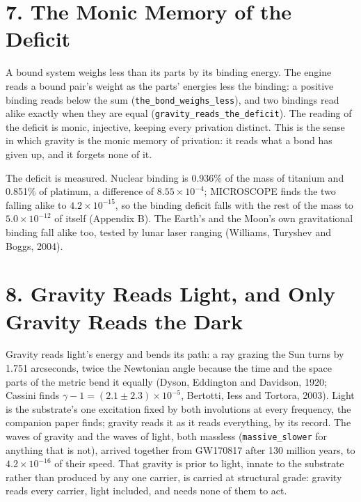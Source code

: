 \documentclass[10pt]{article}
\begin{document}
\hypertarget{the-monic-memory-of-the-deficit}{%
\section{7. The Monic Memory of the
Deficit}\label{the-monic-memory-of-the-deficit}}

A bound system weighs less than its parts by its binding energy. The
engine reads a bound pair's weight as the parts' energies less the
binding: a positive binding reads below the sum
(\texttt{the\_bond\_weighs\_less}), and two bindings read alike exactly
when they are equal (\texttt{gravity\_reads\_the\_deficit}). The reading
of the deficit is monic, injective, keeping every privation distinct.
This is the sense in which gravity is the monic memory of privation: it
reads what a bond has given up, and it forgets none of it.

The deficit is measured. Nuclear binding is 0.936\% of the mass of
titanium and 0.851\% of platinum, a difference of \(8.55\times10^{-4}\);
MICROSCOPE finds the two falling alike to \(4.2\times10^{-15}\), so the
binding deficit falls with the rest of the mass to \(5.0\times10^{-12}\)
of itself (Appendix B). The Earth's and the Moon's own gravitational
binding fall alike too, tested by lunar laser ranging (Williams,
Turyshev and Boggs, 2004).

\hypertarget{gravity-reads-light-and-only-gravity-reads-the-dark}{%
\section{8. Gravity Reads Light, and Only Gravity Reads the
Dark}\label{gravity-reads-light-and-only-gravity-reads-the-dark}}

Gravity reads light's energy and bends its path: a ray grazing the Sun
turns by 1.751 arcseconds, twice the Newtonian angle because the time
and the space parts of the metric bend it equally (Dyson, Eddington and
Davidson, 1920; Cassini finds \(\gamma-1=(2.1\pm2.3)\times10^{-5}\),
Bertotti, Iess and Tortora, 2003). Light is the substrate's one
excitation fixed by both involutions at every frequency, the companion
paper finds; gravity reads it as it reads everything, by its record. The
waves of gravity and the waves of light, both massless
(\texttt{massive\_slower} for anything that is not), arrived together
from GW170817 after 130 million years, to \(4.2\times10^{-16}\) of their
speed. That gravity is prior to light, innate to the substrate rather
than produced by any one carrier, is carried at structural grade:
gravity reads every carrier, light included, and needs none of them to
act.
\end{document}
